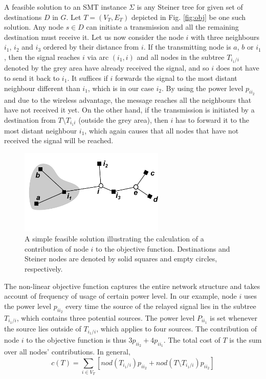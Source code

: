 A feasible solution to an SMT instance $\Sigma$ is any Steiner tree for given set of destinations $D$ in $G$. Let $T=(V_T, E_T)$ depicted in Fig. \ref{fig:obj} be one such solution. Any node $s\in D$ can initiate a transmission and all the remaining destination must receive it. Let us now consider the node $i$ with three neighbours $i_1$, $i_2$ and $i_3$ ordered by their distance from $i$. If the transmitting node is $a$, $b$ or $i_1$, then the signal reaches $i$ via arc $(i_1,i)$ and all nodes in the subtree $T_{i_1/i}$ denoted by the grey area have already received the signal, and so $i$ does not have to send it back to $i_1$. It suffices if $i$ forwards the signal to the most distant neighbour different than $i_1$, which is in our case $i_2$. By using the power level $p_{ii_2}$ and due to the wireless advantage, the message reaches all the neighbours that have not received it yet. On the other hand, if the transmission is initiated by a destination from $T\setminus T_{i_1i}$ (outside the grey area), then $i$ has to forward it to the most distant neighbour $i_1$, which again causes that all nodes that have not received the signal will be reached.
\begin{figure}[h!]
        \centering
        \includegraphics[height=1.6in]{objexp}
        \caption{A simple feasible solution illustrating the calculation of a contribution of node $i$ to the objective function. Destinations and Steiner nodes are denoted by solid squares and empty circles, respectively.}
\end{figure}

 The non-linear objective function captures the entire network structure and takes account of frequency of usage of certain power level. In our example, node $i$ uses the power level $p_{ii_2}$ every time the source of the relayed signal lies in the subtree $T_{i_1/i}$, which contains three potential sources. The power level $P_{ii_1}$ is set whenever the source lies outside of $T_{i_1/i}$, which applies to four sources. The contribution of node $i$ to the objective function is thus $3p_{ii_2} + 4p_{ii_1}$. The total cost of $T$ is the sum over all nodes' contributions. In general,
$$
c(T) = \sum\limits_{i\in V_T}\left[nod(T_{i_1/i})p_{ii_2} + nod(T\setminus T_{i_1/i})p_{ii_2}\right]
$$ 

